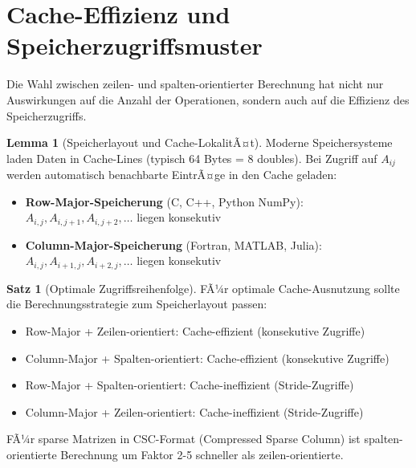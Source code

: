 ﻿\documentclass[a4paper,12pt]{report}
\theoremstyle{definition}
\newtheorem{satz}{Satz}
\newtheorem{lemma}{Lemma}
\begin{document}
	\section{Cache-Effizienz und Speicherzugriffsmuster}
	
	Die Wahl zwischen zeilen- und spalten-orientierter Berechnung hat nicht nur Auswirkungen auf die Anzahl der Operationen, sondern auch auf die Effizienz des Speicherzugriffs.
	
	\begin{lemma}[Speicherlayout und Cache-LokalitÃ¤t]
		Moderne Speichersysteme laden Daten in Cache-Lines (typisch 64 Bytes = 8 doubles). Bei Zugriff auf $A_{ij}$ werden automatisch benachbarte EintrÃ¤ge in den Cache geladen:
		\begin{itemize}
			\item \textbf{Row-Major-Speicherung} (C, C++, Python NumPy): $A_{i,j}, A_{i,j+1}, A_{i,j+2}, \ldots$ liegen konsekutiv
			\item \textbf{Column-Major-Speicherung} (Fortran, MATLAB, Julia): $A_{i,j}, A_{i+1,j}, A_{i+2,j}, \ldots$ liegen konsekutiv
		\end{itemize}
	\end{lemma}
	
	\begin{satz}[Optimale Zugriffsreihenfolge]
		FÃ¼r optimale Cache-Ausnutzung sollte die Berechnungsstrategie zum Speicherlayout passen:
		\begin{itemize}
			\item Row-Major + Zeilen-orientiert: Cache-effizient (konsekutive Zugriffe)
			\item Column-Major + Spalten-orientiert: Cache-effizient (konsekutive Zugriffe)
			\item Row-Major + Spalten-orientiert: Cache-ineffizient (Stride-Zugriffe)
			\item Column-Major + Zeilen-orientiert: Cache-ineffizient (Stride-Zugriffe)
		\end{itemize}
		
		FÃ¼r sparse Matrizen in CSC-Format (Compressed Sparse Column) ist spalten-orientierte Berechnung um Faktor 2-5 schneller als zeilen-orientierte.
	\end{satz}
	
\end{document}
